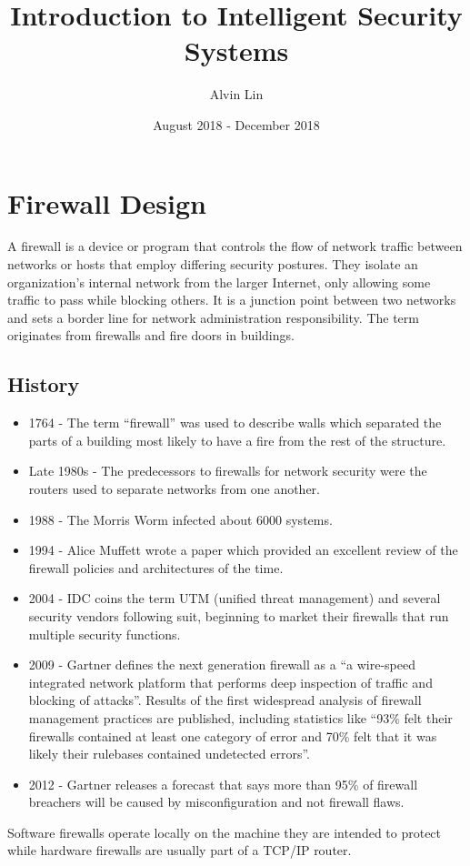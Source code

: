 \documentclass{math}
\title{Introduction to Intelligent Security Systems}
\author{Alvin Lin}
\date{August 2018 - December 2018}
\begin{document}
\maketitle

\section*{Firewall Design}
A firewall is a device or program that controls the flow of network traffic
between networks or hosts that employ differing security postures. They isolate
an organization's internal network from the larger Internet, only allowing some
traffic to pass while blocking others. It is a junction point between two
networks and sets a border line for network administration responsibility. The
term originates from firewalls and fire doors in buildings.

\subsection*{History}
\begin{itemize}
  \item 1764 - The term ``firewall'' was used to describe walls which
    separated the parts of a building most likely to have a fire from the rest
    of the structure.
  \item Late 1980s - The predecessors to firewalls for network security were the
    routers used to separate networks from one another.
  \item 1988 - The Morris Worm infected about 6000 systems.
  \item 1994 - Alice Muffett wrote a paper which provided an excellent review
    of the firewall policies and architectures of the time.
  \item 2004 - IDC coins the term UTM (unified threat management) and several
    security vendors following suit, beginning to market their firewalls that
    run multiple security functions.
  \item 2009 - Gartner defines the next generation firewall as a ``a wire-speed
    integrated network platform that performs deep inspection of traffic and
    blocking of attacks''. Results of the first widespread analysis of firewall
    management practices are published, including statistics like ``93\% felt
    their firewalls contained at least one category of error and 70\% felt
    that it was likely their rulebases contained undetected errors''.
  \item 2012 - Gartner releases a forecast that says more than 95\% of firewall
    breachers will be caused by misconfiguration and not firewall flaws.
\end{itemize}
Software firewalls operate locally on the machine they are intended to protect
while hardware firewalls are usually part of a TCP/IP router.
\end{document}
